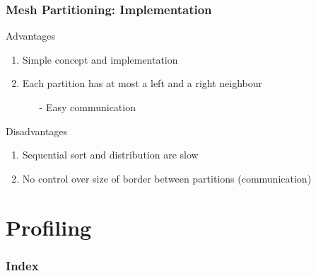 \documentclass{beamer}
\begin{document}
\begin{frame}
\frametitle{Mesh Partitioning: Implementation}

	\begin{block}{Advantages}
		\begin{enumerate}\itemsep=10pt
			\item Simple concept and implementation
			\item Each partition has at most a left and a right neighbour
			\begin{itemize}
				\item[-] Easy communication
			\end{itemize}
		\end{enumerate}
	\end{block}

	\begin{block}{Disadvantages}
		\begin{enumerate}\itemsep=10pt
			\item Sequential sort and distribution are slow
			\item No control over size of border between partitions (communication)
		\end{enumerate}
	\end{block}

\end{frame}



%
%
%
%

\section{Profiling}

\begin{frame}
	\frametitle{Index}
	\tableofcontents[currentsection]
\end{frame}
\end{document}
